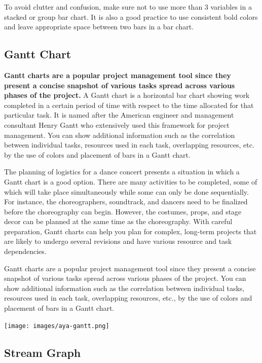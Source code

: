\documentclass[]{book}
\begin{document}
To avoid clutter and confusion, make sure not to use more than 3 variables in a stacked or group bar chart. It is also a good practice to use consistent bold colors and leave appropriate space between two bars in a bar chart.

\hypertarget{gantt-chart}{%
\subsection{Gantt Chart}\label{gantt-chart}}

\textbf{Gantt charts are a popular project management tool since they present a concise snapshot of various tasks spread across various phases of the project.} A Gantt chart is a horizontal bar chart showing work completed in a certain period of time with respect to the time allocated for that particular task. It is named after the American engineer and management consultant Henry Gantt who extensively used this framework for project management. You can show additional information such as the correlation between individual tasks, resources used in each task, overlapping resources, etc. by the use of colors and placement of bars in a Gantt chart.

The planning of logistics for a dance concert presents a situation in which a Gantt chart is a good option. There are many activities to be completed, some of which will take place simultaneously while some can only be done sequentially. For instance, the choreographers, soundtrack, and dancers need to be finalized before the choreography can begin. However, the costumes, props, and stage decor can be planned at the same time as the choreography. With careful preparation, Gantt charts can help you plan for complex, long-term projects that are likely to undergo several revisions and have various resource and task dependencies.

Gantt charts are a popular project management tool since they present a concise snapshot of various tasks spread across various phases of the project. You can show additional information such as the correlation between individual tasks, resources used in each task, overlapping resources, etc., by the use of colors and placement of bars in a Gantt chart.

\texttt{[image: images/aya-gantt.png]}

\hypertarget{stream-graph}{%
\subsection{Stream Graph}\label{stream-graph}}
\end{document}
